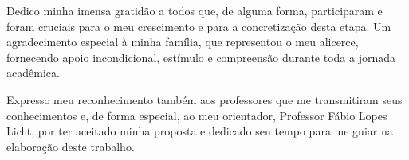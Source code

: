 

\begin{agradecimentos}
Dedico minha imensa gratidão a todos que, de alguma forma, participaram e foram cruciais para o meu crescimento e para a concretização desta etapa. Um agradecimento especial à minha família, que representou o meu alicerce, fornecendo apoio incondicional, estímulo e compreensão durante toda a jornada acadêmica.

Expresso meu reconhecimento também aos professores que me transmitiram seus conhecimentos e, de forma especial, ao meu orientador, Professor Fábio Lopes Licht, por ter aceitado minha proposta e dedicado seu tempo para me guiar na elaboração deste trabalho.


\end{agradecimentos}


%
%

